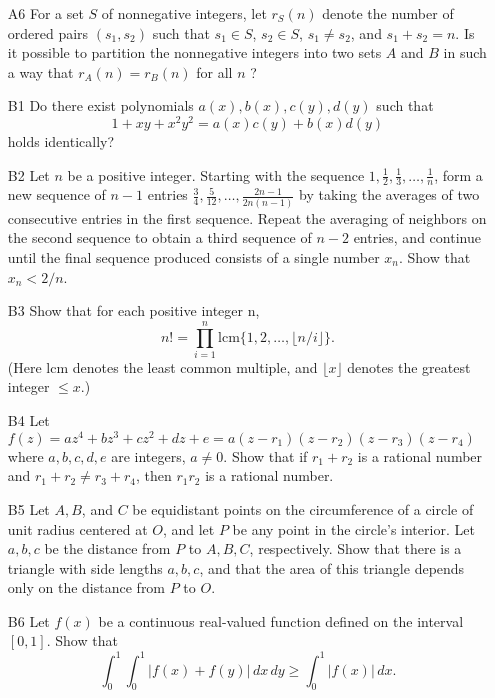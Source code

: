 \documentclass[amssymb,twocolumn,pra,10pt,aps]{revtex4-1}
\begin{document}
\begin{itemize}
\item[A6]
For a set  $S$  of nonnegative integers, let  $r_S(n)$  denote the number of
ordered pairs  $(s_1, s_2)$  such that  $s_1 \in S$, $s_2 \in S$, $s_1 \ne
s_2$,
and  $s_1 + s_2 = n$.  Is it possible to partition the nonnegative
integers into two sets  $A$  and  $B$  in such a way that  $r_A(n) = r_B(n)$
for all  $n$ ?

\item[B1]
Do there exist polynomials  $a(x), b(x), c(y), d(y)$  such that
\[
       1 + x y + x^2 y^2 = a(x) c(y) + b(x) d(y)
\]
holds identically?

\item[B2]
Let  $n$  be a positive integer. Starting with the sequence
$1, \frac{1}{2}, \frac{1}{3}, \dots, \frac{1}{n}$,
form a new sequence of  $n-1$  entries
$\frac{3}{4}, \frac{5}{12}, \dots, \frac{2n-1}{2n(n-1)}$
by taking the averages of
two consecutive entries in the first sequence. Repeat the
averaging of neighbors on the second sequence to obtain a third
sequence of  $n-2$  entries, and continue until the final sequence produced
consists of a single number  $x_n$.  Show that  $x_n < 2/n$.

\item[B3]
Show that for each positive integer  n,
\[
    n! = \prod_{i=1}^n  \mathrm{lcm}\{1, 2, \dots, \lfloor n/i\rfloor\} .
\]
(Here $\mathrm{lcm}$ denotes the least common multiple, and
$\lfloor x \rfloor$ denotes the greatest integer $\leq x$.)

\item[B4]
Let $f(z) = a z^4 + b z^3 + c z^2 + d z + e = a(z-r_1)(z-r_2)(z-r_3)(z-r_4)$
where  $a,b,c,d,e$  are integers, $a \ne 0$.  Show that if  $r_1 + r_2$  is a
rational number and $r_1 + r_2 \ne r_3 + r_4$,  then  $r_1 r_2$  is a
rational number.

\item[B5]
Let  $A,B$, and $C$  be equidistant points on the circumference of a circle
of unit radius centered at  $O$,  and let  $P$  be any point in the circle's
interior.  Let  $a, b, c$  be the distance from  $P$  to $A, B, C$,
respectively.
Show that there is a triangle with side lengths  $a, b, c$,  and that the
area of this triangle depends only on the distance from  $P$  to  $O$.

\item[B6]
Let  $f(x)$  be  a continuous real-valued function defined on the interval
$[0,1]$. Show that
\[
   \int_0^1 \int_0^1 | f(x) + f(y) |\,dx\,dy \geq \int_0^1 |f(x)|\,dx.
\]

\end{itemize}
\end{document}
